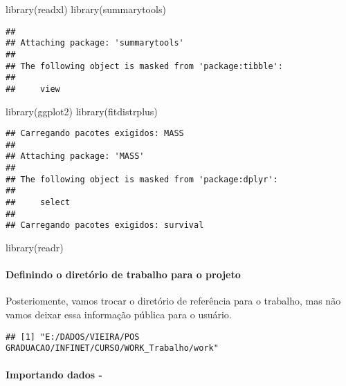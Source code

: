 \documentclass[
]{article}
\newenvironment{Shaded}{\begin{snugshade}}{\end{snugshade}}
\newcommand{\FunctionTok}[1]{\textcolor[rgb]{0.00,0.00,0.00}{#1}}
\newcommand{\NormalTok}[1]{#1}
\begin{document}
\begin{Shaded}
\begin{Highlighting}[]
\FunctionTok{library}\NormalTok{(readxl)}
\FunctionTok{library}\NormalTok{(summarytools)}
\end{Highlighting}
\end{Shaded}

\begin{verbatim}
## 
## Attaching package: 'summarytools'
## 
## The following object is masked from 'package:tibble':
## 
##     view
\end{verbatim}

\begin{Shaded}
\begin{Highlighting}[]
\FunctionTok{library}\NormalTok{(ggplot2)}
\FunctionTok{library}\NormalTok{(fitdistrplus)}
\end{Highlighting}
\end{Shaded}

\begin{verbatim}
## Carregando pacotes exigidos: MASS
## 
## Attaching package: 'MASS'
## 
## The following object is masked from 'package:dplyr':
## 
##     select
## 
## Carregando pacotes exigidos: survival
\end{verbatim}

\begin{Shaded}
\begin{Highlighting}[]
\FunctionTok{library}\NormalTok{(readr)}
\end{Highlighting}
\end{Shaded}

\hypertarget{definindo-o-diretuxf3rio-de-trabalho-para-o-projeto}{%
\paragraph{Definindo o diretório de trabalho para o projeto}\label{definindo-o-diretuxf3rio-de-trabalho-para-o-projeto}}

Posteriomente, vamos trocar o diretório de referência para o trabalho, mas não vamos deixar essa informação pública para o usuário.

\begin{verbatim}
## [1] "E:/DADOS/VIEIRA/POS GRADUACAO/INFINET/CURSO/WORK_Trabalho/work"
\end{verbatim}

\hypertarget{importando-dados--}{%
\paragraph{Importando dados -}\label{importando-dados--}}
\end{document}
